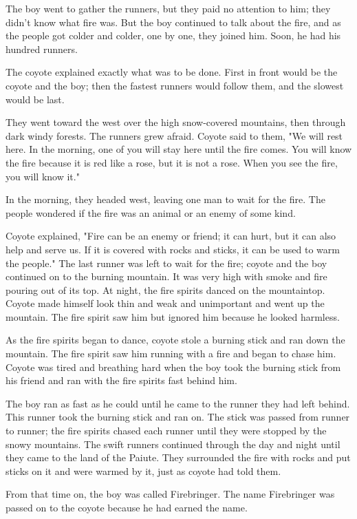 The boy went to gather the runners, but they paid no attention to him; they didn't know what fire was. But the boy continued to talk about the fire, and as the people got colder and colder, one by one, they joined him. Soon, he had his hundred runners.

The coyote explained exactly what was to be done. First in front would be the coyote and the boy; then the fastest runners would follow them, and the slowest would be last.

They went toward the west over the high snow-covered mountains, then through dark windy forests. The runners grew afraid. Coyote said to them, "We will rest here. In the morning, one of you will stay here until the fire comes. You will know the fire because it is red like a rose, but it is not a rose. When you see the fire, you will know it."

In the morning, they headed west, leaving one man to wait for the fire. The people wondered if the fire was an animal or an enemy of some kind.

Coyote explained, "Fire can be an enemy or friend; it can hurt, but it can also help and serve us. If it is covered with rocks and sticks, it can be used to warm the people." The last runner was left to wait for the fire; coyote and the boy continued on to the burning mountain. It was very high with smoke and fire pouring out of its top. At night, the fire spirits danced on the mountaintop. Coyote made himself look thin and weak and unimportant and went up the mountain. The fire spirit saw him but ignored him because he looked harmless.

As the fire spirits began to dance, coyote stole a burning stick and ran down the mountain. The fire spirit saw him running with a fire and began to chase him. Coyote was tired and breathing hard when the boy took the burning stick from his friend and ran with the fire spirits fast behind him.

The boy ran as fast as he could until he came to the runner they had left behind. This runner took the burning stick and ran on. The stick was passed from runner to runner; the fire spirits chased each runner until they were stopped by the snowy mountains. The swift runners continued through the day and night until they came to the land of the Paiute. They surrounded the fire with rocks and put sticks on it and were warmed by it, just as coyote had told them.

From that time on, the boy was called Firebringer. The name Firebringer was passed on to the coyote because he had earned the name.

